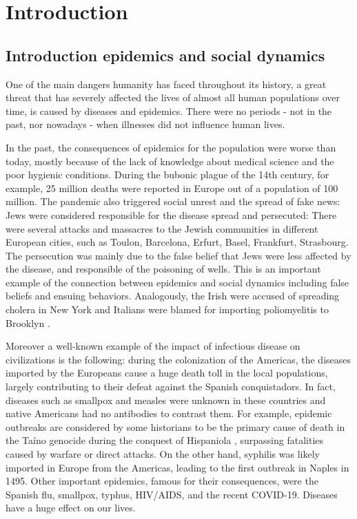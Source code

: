 \part{Introduction}

\chapter{Introduction epidemics and social dynamics}

One of the main dangers humanity has faced throughout its history, a great threat that has severely affected the lives of almost all human populations over time, is caused by diseases and epidemics. There were no periods - not in the past, nor nowadays - when illnesses did not influence human lives. 

In the past, the consequences of epidemics for the population were worse than today, mostly because of the lack of knowledge about medical science and the poor hygienic conditions. During the bubonic plague of the 14th century, for example, 25 million deaths were reported in Europe out of a population of 100 million. The pandemic also triggered social unrest and the spread of fake news: Jews were considered responsible for the disease spread and persecuted: There were several attacks and massacres to the Jewish communities in different European cities, such as Toulon, Barcelona, Erfurt, Basel, Frankfurt, Strasbourg. The persecution was mainly due to the false belief that Jews were less affected by the disease, and responsible of the poisoning of wells. This is an important example of the connection between epidemics and social dynamics including false beliefs and ensuing behaviors. Analogously, the Irish were accused of spreading cholera in New York and Italians were blamed for importing poliomyelitis to Brooklyn \cite{risse1988epidemics}. 

Moreover a well-known example of the impact of infectious disease on civilizations is the following: during the colonization of the Americas, the diseases imported by the Europeans cause a huge death toll in the local populations, largely contributing to their defeat against the Spanish conquistadors. In fact, diseases such as smallpox and measles were unknown in these countries and native Americans had no antibodies to contrast them. For example, epidemic outbreaks are considered by some historians to be the primary cause of death in the Taíno genocide during the conquest of Hispaniola \cite{keegan1992destruction}, surpassing fatalities caused by warfare or direct attacks. 
On the other hand, syphilis was likely imported in Europe from the Americas, leading to the first outbreak in Naples in 1495.
Other important epidemics, famous for their consequences, were the Spanish flu, smallpox, typhus, HIV/AIDS, and the recent COVID-19. Diseases have a huge effect on our lives.

